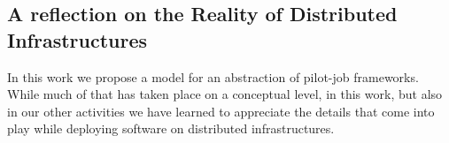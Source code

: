 \documentclass[conference,final]{IEEEtran}
\newcommand{\smnote}[1]{ {\textcolor{brown} { ***sharath: #1 }}}
\newcommand{\smnote}[1]{}
\begin{document}









\subsection{A reflection on the Reality of Distributed Infrastructures}

In this work we propose a model for an abstraction of pilot-job frameworks.
While much of that has taken place on a conceptual level, in this work,
but also in our other activities we have learned to appreciate the details that
come into play while deploying software on distributed infrastructures.
\end{document}
